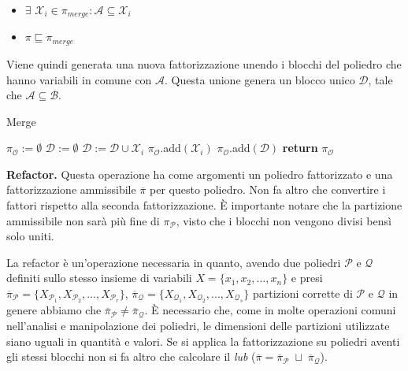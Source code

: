 \documentclass{mimosis}
\theoremstyle{definition}
\begin{document}
\begin{itemize}
\item \(\exists\) \(\mathcal{X}_i \in \pi_{merge} : \mathcal{A} \subseteq \mathcal{X}_i\)
\item \(\pi \sqsubseteq \pi_{merge}\)
\end{itemize}

Viene quindi generata una nuova fattorizzazione unendo i blocchi del poliedro
che hanno variabili in comune con \(\mathcal{A}\). Questa unione genera un blocco
unico \(\mathcal{D}\), tale che \(\mathcal{A} \subseteq \mathcal{B}\).

\begin{algorithm}[H]
\caption{Merge}\label{merge}
\begin{algorithmic}[1]
\State$\pi_{\mathcal{O}} := \emptyset$
\State$\mathcal{D} := \emptyset$
\State$\mathcal{D} := \mathcal{D} \cup \mathcal{X}_{i}$
\Else
\State$\pi_{\mathcal{O}}$.add$(\mathcal{X}_{i})$
\EndIf
\EndFor
\State$\pi_{\mathcal{O}}$.add$(\mathcal{D})$
\State\textbf{return} $\pi_{\mathcal{O}}$
\EndFunction
\end{algorithmic}
\end{algorithm}

\-\hspace{0.1cm} \textbf{Refactor.} Questa operazione ha come argomenti un poliedro
fattorizzato e una fattorizzazione ammissibile \(\overline{\pi}\) per questo
poliedro. Non fa altro che convertire i fattori rispetto alla seconda
fattorizzazione. È importante notare che la partizione ammissibile non sarà più
fine di \(\pi_{\mathcal{P}}\), visto che i blocchi non vengono divisi bensì solo
uniti.

La refactor è un'operazione necessaria in quanto, avendo due poliedri
\(\mathcal{P}\) e \(\mathcal{Q}\) definiti sullo stesso insieme di variabili \(X =
\{x_1, x_2, ..., x_n\}\) e presi \(\overline{\pi}_{\mathcal{P}} =
\{X_{\mathcal{P}_1}, X_{\mathcal{P}_2}, ..., X_{\mathcal{P}_r}\}\),
\(\overline{\pi}_{\mathcal{Q}} = \{X_{\mathcal{Q}_1}, X_{\mathcal{Q}_2}, ...,
X_{\mathcal{Q}_s}\}\)
partizioni corrette di \(\mathcal{P}\) e \(\mathcal{Q}\) in genere abbiamo che
\(\overline{\pi}_{\mathcal{P}} \ne \overline{\pi}_{\mathcal{Q}}\). È necessario
che, come in molte operazioni comuni nell'analisi e manipolazione dei poliedri,
le dimensioni delle partizioni utilizzate siano uguali in quantità e valori. Se
si applica la fattorizzazione su poliedri aventi gli stessi blocchi non si fa
altro che calcolare il \emph{lub} (\(\overline{\pi} = \overline{\pi}_{\mathcal{P}}
\; \sqcup \; \overline{\pi}_{\mathcal{Q}}\)).
\end{document}
